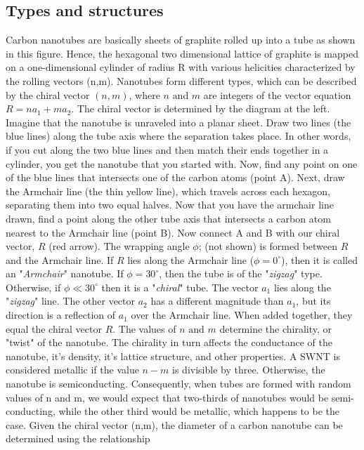 \subsection {Types and structures}
Carbon nanotubes are basically sheets of graphite rolled up into a tube as shown in this figure. Hence, the hexagonal two dimensional lattice of graphite is mapped on a one-dimensional cylinder of radius R with various helicities characterized by the rolling vectors (n,m).\cite{types_taner} Nanotubes form different types, which can be described by the chiral vector $(n, m)$, where $n\text{ and }m$ are integers of the vector equation $R = n a_1 + m a_2$. The chiral vector is determined by the diagram at the left. Imagine that the nanotube is unraveled into a planar sheet. Draw two lines (the blue lines) along the tube axis where the separation takes place. In other words, if you cut along the two blue lines and then match their ends together in a cylinder, you get the nanotube that you started with. Now, find any point on one of the blue lines that intersects one of the carbon atoms (point A). Next, draw the Armchair line (the thin yellow line), which travels across each hexagon, separating them into two equal halves. Now that you have the armchair line drawn, find a point along the other tube axis that intersects a carbon atom nearest to the Armchair line (point B). Now connect A and B with our chiral vector, $R$ (red arrow). The wrapping angle $\phi$; (not shown) is formed between $R$ and the Armchair line. If $R$ lies along the Armchair line ($\phi=0^\circ$), then it is called an "\textit{Armchair}" nanotube. If $\phi=30^\circ$, then the tube is of the "\textit{zigzag}" type. Otherwise, if $\phi \ll 30^\circ$ then it is a "\textit{chiral}" tube. The vector $a_1$ lies along the "\textit{zigzag}" line. The other vector $a_2$ has a different magnitude than $a_1$, but its direction is a reflection of $a_1$ over the Armchair line. When added together, they equal the chiral vector $R$.
The values of $n\text{ and }m$ determine the chirality, or "twist" of the nanotube. The chirality in turn affects the conductance of the nanotube, it's density, it's lattice structure, and other properties. A SWNT is considered metallic if the value $n - m$ is divisible by three. Otherwise, the nanotube is semiconducting. Consequently, when tubes are formed with random values of n and m, we would expect that two-thirds of nanotubes would be semi-conducting, while the other third would be metallic, which happens to be the case.\cite{eqstruct}
Given the chiral vector (n,m), the diameter of a carbon nanotube can be determined using the relationship\\
